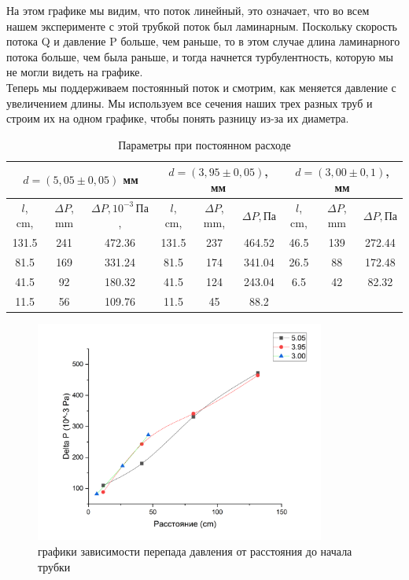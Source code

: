 \documentclass[a4paper, 12pt]{article}%
\begin{document}
\newpage На этом графике мы видим, что поток линейный, это означает, что во всем нашем эксперименте с этой трубкой поток был ламинарным. Поскольку скорость потока Q и давление P больше, чем раньше, то в этом случае длина ламинарного потока больше, чем была раньше, и тогда начнется турбулентность, которую мы не могли видеть на графике.\\
\linebreak
 Теперь мы поддерживаем постоянный поток и смотрим, как меняется давление с увеличением длины. Мы используем все сечения наших трех разных труб и строим их на одном графике, чтобы понять разницу из-за их диаметра.
\newpage
\begin{table}
 \begin{tabular}{|c|c|c|c|c|c|c|c|c|}
\hline
\multicolumn{3}{|c|}{$d = (5,05 \pm 0,05)$ мм} & \multicolumn{3}{c|}{$d = (3,95 \pm 0,05)$, мм} & \multicolumn{3}{c|}{$d = (3,00 \pm 0,1)$, мм} \\ \hline
$l$, cm, & $\Delta P$, mm & $\Delta P, 10^{-3}\, \text{Па}$,& $l$, cm,& $\Delta P$, mm, & $\Delta P, \text{Па}$ & $l$, cm,& $\Delta P$, mm & $\Delta P,\text{Па}$ \\ \hline
131.5 & 241 & 472.36 & 131.5 & 237 & 464.52 & 46.5 & 139 & 272.44 \\ \hline
81.5 & 169 & 331.24 & 81.5 & 174 & 341.04 & 26.5 & 88 & 172.48 \\ \hline
41.5 & 92 & 180.32 & 41.5 & 124 & 243.04 & 6.5 & 42 & 82.32 \\ \hline
11.5 & 56 & 109.76 & 11.5 & 45 & 88.2 & & & \\ \hline
\end{tabular}
\caption{Параметры при постоянном расходе}
\end{table}

\begin{figure}[h!]
	\begin{center}
		\includegraphics[width = 0.85\textwidth]{labphoto11}
		\caption{графики зависимости перепада давления от расстояния до начала трубки}
	\end{center}
\end{figure}
\end{document}
